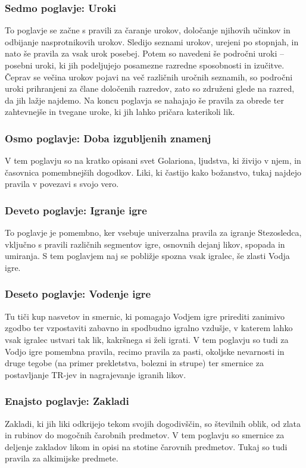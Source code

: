 \subsubsection{Sedmo poglavje: Uroki}
To poglavje se začne s pravili za čaranje urokov, določanje njihovih učinkov in odbijanje nasprotnikovih urokov. Sledijo seznami urokov, urejeni po stopnjah, in nato še pravila za vsak urok posebej. Potem so navedeni še področni uroki -- posebni uroki, ki jih podeljujejo posamezne razredne sposobnosti in izučitve. Čeprav se večina urokov pojavi na več različnih uročnih seznamih, so področni uroki prihranjeni za člane določenih razredov, zato so združeni glede na razred, da jih lažje najdemo. Na koncu poglavja se nahajajo še pravila za obrede ter zahtevnejše in tvegane uroke, ki jih lahko pričara katerikoli lik.

\subsubsection{Osmo poglavje: Doba izgubljenih znamenj}
V tem poglavju so na kratko opisani svet Golariona, ljudstva, ki živijo v njem, in časovnica pomembnejših dogodkov. Liki, ki častijo kako božanstvo, tukaj najdejo pravila v povezavi s svojo vero.

\subsubsection{Deveto poglavje: Igranje igre}
To poglavje je pomembno, ker vsebuje univerzalna pravila za igranje Stezosledca, vključno s pravili različnih segmentov igre, osnovnih dejanj likov, spopada in umiranja. S tem poglavjem naj se pobližje spozna vsak igralec, še zlasti Vodja igre.

\subsubsection{Deseto poglavje: Vodenje igre}
Tu tiči kup nasvetov in smernic, ki pomagajo Vodjem igre prirediti zanimivo zgodbo ter vzpostaviti zabavno in spodbudno igralno vzdušje, v katerem lahko vsak igralec ustvari tak lik, kakršnega si želi igrati. V tem poglavju so tudi za Vodjo igre pomembna pravila, recimo pravila za pasti, okoljske nevarnosti in druge tegobe (na primer prekletstva, bolezni in strupe) ter smernice za postavljanje TR-jev in nagrajevanje igranih likov.

\subsubsection{Enajsto poglavje: Zakladi}
Zakladi, ki jih liki odkrijejo tekom svojih dogodivščin, so številnih oblik, od zlata in rubinov do mogočnih čarobnih predmetov. V tem poglavju so smernice za deljenje zakladov likom in opisi na stotine čarovnih predmetov. Tukaj so tudi pravila za alkimijske predmete.

